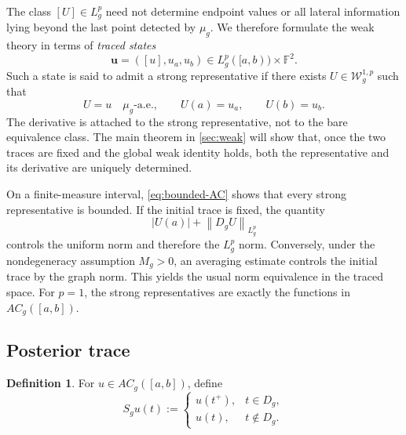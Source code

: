 \documentclass[preprint,12pt]{elsarticle}
\theoremstyle{definition}
\newtheorem{definition}[theorem]{Definition}
\theoremstyle{remark}
\newcommand{\F}{\mathbb F}
\newcommand{\ACg}{AC_g}
\newcommand{\norm}[1]{\left\lVert#1\right\rVert}
\newcommand{\abs}[1]{\left\lvert#1\right\rvert}
\begin{document}
The class $[U]\in L_g^p$ need not determine endpoint values or all lateral information lying beyond the last point detected by $\mu_g$. We therefore formulate the weak theory in terms of \emph{traced states}
\[
 \mathbf u=([u],u_a,u_b)\in L_g^p([a,b))\times\F^2.
\]
Such a state is said to admit a strong representative if there exists $U\in\mathcal W_g^{1,p}$ such that
\[
 U=u\quad\mu_g\text{-a.e.},
 \qquad U(a)=u_a,
 \qquad U(b)=u_b.
\]
The derivative is attached to the strong representative, not to the bare equivalence class. The main theorem in \cref{sec:weak} will show that, once the two traces are fixed and the global weak identity holds, both the representative and its derivative are uniquely determined.

On a finite-measure interval, \eqref{eq:bounded-AC} shows that every strong representative is bounded. If the initial trace is fixed, the quantity
\[
 \abs{U(a)}+\norm{D_gU}_{L_g^p}
\]
controls the uniform norm and therefore the $L_g^p$ norm. Conversely, under the nondegeneracy assumption $M_g>0$, an averaging estimate controls the initial trace by the graph norm. This yields the usual norm equivalence in the traced space. For $p=1$, the strong representatives are exactly the functions in $AC_g([a,b])$.

\subsection{Posterior trace}

\begin{definition}\label{def:Sg}
For $u\in\ACg([a,b])$, define
\[
 S_gu(t):=
 \begin{cases}
 u(t^+),&t\in D_g,\\
 u(t),&t\notin D_g.
\end{cases}
\]
\end{definition}
\end{document}
